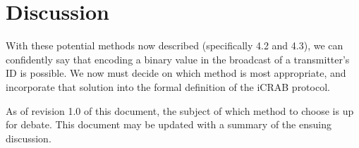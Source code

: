 \documentclass[12pt]{article}
\begin{document}
\section{Discussion}

With these potential methods now described (specifically 4.2 and 4.3),
we can confidently say that encoding a binary value in the broadcast of a
transmitter's ID is possible.
We now must decide on which method is most appropriate, and incorporate that
solution into the formal definition of the iCRAB protocol.

As of revision 1.0 of this document, the subject of which method to choose
is up for debate.
This document may be updated with a summary of the ensuing discussion.
\end{document}
